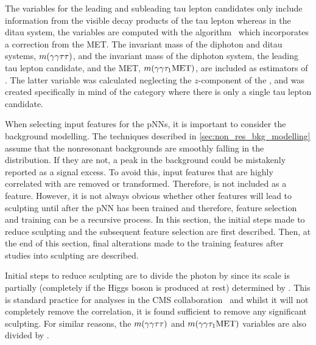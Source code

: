 The variables for the leading and subleading tau lepton candidates only include information from the visible decay products of the tau lepton whereas in the ditau system, the variables are computed with the \SVFit algorithm~\cite{Bianchini:2014vza} which incorporates a correction from the MET. The invariant mass of the diphoton and ditau systems, $m(\gamma\gamma\tau\tau)$, and the invariant mass of the diphoton system, the leading tau lepton candidate, and the MET, $m(\gamma\gamma\tau_1 \text{MET})$, are included as estimators of \mX. The latter variable was calculated neglecting the $z$-component of the \MET, and was created specifically in mind of the \tauh category where there is only a single tau lepton candidate. 

When selecting input features for the pNNs, it is important to consider the background modelling. The techniques described in \cref{sec:non_res_bkg_modelling} assume that the nonresonant backgrounds are smoothly falling in the \mgg distribution. If they are not, a peak in the background could be mistakenly reported as a signal excess. To avoid this, input features that are highly correlated with \mgg are removed or transformed. Therefore, \mgg is not included as a feature. However, it is not always obvious whether other features will lead to sculpting until after the pNN has been trained and therefore, feature selection and training can be a recursive process. In this section, the initial steps made to reduce sculpting and the subsequent feature selection are first described. Then, at the end of this section, final alterations made to the training features after studies into sculpting are described.

Initial steps to reduce sculpting are to divide the photon \pt by \mgg since its scale is partially (completely if the Higgs boson is produced at rest) determined by \mgg. This is standard practice for \Hgg analyses in the CMS collaboration~\cite{CMS:2021kom} and whilst it will not completely remove the correlation, it is found sufficient to remove any significant sculpting. For similar reasons, the $m(\gamma\gamma\tau\tau)$ and $m(\gamma\gamma\tau_1\text{MET})$ variables are also divided by \mgg.

